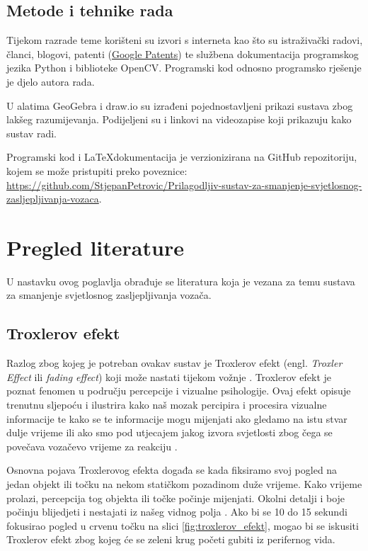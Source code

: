 \documentclass{foi}
\begin{document}
\section{Metode i tehnike rada}

Tijekom razrade teme korišteni su izvori s interneta kao što su istraživački radovi, članci, blogovi, patenti (\href{https://patents.google.com/}{Google Patents}) te službena dokumentacija programskog jezika Python i biblioteke OpenCV. Programski kod odnosno programsko rješenje je djelo autora rada.

U alatima GeoGebra i draw.io su izrađeni pojednostavljeni prikazi sustava zbog lakšeg razumijevanja. Podijeljeni su i linkovi na videozapise koji prikazuju kako sustav radi.

Programski kod i \LaTeX \space dokumentacija je verzionizirana na GitHub repozitoriju, kojem se može pristupiti preko poveznice: \url{https://github.com/StjepanPetrovic/Prilagodljiv-sustav-za-smanjenje-svjetlosnog-zasljepljivanja-vozaca}.

\chapter{Pregled literature}

U nastavku ovog poglavlja obrađuje se literatura koja je vezana za temu sustava za smanjenje svjetlosnog zasljepljivanja vozača.

\section{Troxlerov efekt}

Razlog zbog kojeg je potreban ovakav sustav je Troxlerov efekt (engl. \emph{Troxler Effect} ili \emph{fading effect}) koji može nastati tijekom vožnje \cite{Autoevolution2022}. Troxlerov efekt je poznat fenomen u području percepcije i vizualne psihologije. Ovaj efekt opisuje trenutnu sljepoću i ilustrira kako naš mozak percipira i procesira vizualne informacije te kako se te informacije mogu mijenjati ako gledamo na istu stvar dulje vrijeme ili ako smo pod utjecajem jakog izvora svjetlosti zbog čega se povečava vozačevo vrijeme za reakciju \cite[str. 208]{P2014}.

Osnovna pojava Troxlerovog efekta događa se kada fiksiramo svoj pogled na jedan objekt ili točku na nekom statičkom pozadinom duže vrijeme. Kako vrijeme prolazi, percepcija tog objekta ili točke počinje mijenjati. Okolni detalji i boje počinju blijedjeti i nestajati iz našeg vidnog polja \cite[str. 664]{Kanai2003}. Ako bi se 10 do 15 sekundi fokusirao pogled u crvenu točku na slici \ref{fig:troxlerov_efekt}, mogao bi se iskusiti Troxlerov efekt zbog kojeg će se zeleni krug početi gubiti iz perifernog vida.
\end{document}
